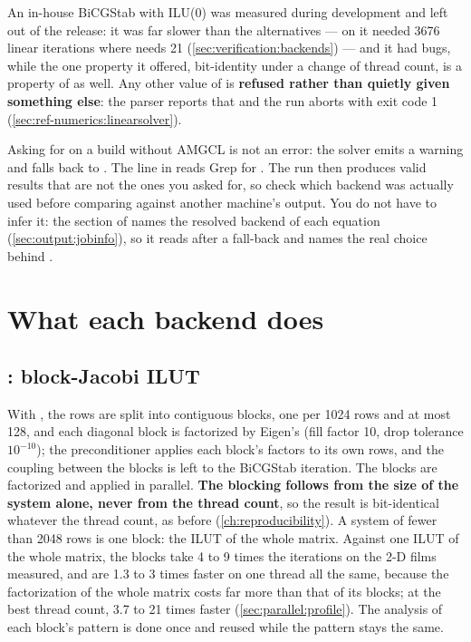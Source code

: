 \begin{note}
  An in-house BiCGStab with ILU(0) was measured during development and left
  out of the release: it was far slower than the alternatives --- on
   it needed 3676 linear iterations where
   needs 21 (\cref{sec:verification:backends}) --- and it had
  bugs, while the one property it offered, bit-identity under a change of
  thread count, is a property of  as well. Any other value of
   is \textbf{refused rather than quietly given something
  else}: the parser reports that   and the run aborts with exit code 1
  (\cref{sec:ref-numerics:linearsolver}).
\end{note}

Asking for  on a build without AMGCL is not an error: the solver
emits a warning and falls back to . The line in
 reads  Grep for
. The run then produces valid
results that are not the ones you asked for, so check which backend was
actually used before comparing against another machine's output. You do not
have to infer it: the  section of
 names the resolved backend of each equation
(\cref{sec:output:jobinfo}), so it reads  after a fall-back and
names the real choice behind .

\section{What each backend does}
\label{sec:linsolve:what}

\subsection{: block-Jacobi ILUT}
\label{sec:linsolve:eigen}

With  , the rows are split into contiguous
blocks, one per 1024 rows and at most 128, and each diagonal block is
factorized by Eigen's  (fill factor 10, drop tolerance
$10^{-10}$); the preconditioner applies each block's factors to its own rows,
and the coupling between the blocks is left to the BiCGStab iteration. The
blocks are factorized and applied in parallel. \textbf{The blocking follows
from the size of the system alone, never from the thread count}, so the
result is bit-identical whatever the thread count, as before
(\cref{ch:reproducibility}). A system of fewer than 2048 rows is one block:
the ILUT of the whole matrix. Against one ILUT of the whole matrix, the blocks
take 4 to 9 times the iterations on the 2-D films measured, and are 1.3 to 3
times faster on one thread all the same, because the factorization of the
whole matrix costs far more than that of its blocks; at the best thread
count, 3.7 to 21 times faster (\cref{sec:parallel:profile}). The analysis of each block's
pattern is done once and reused while the pattern stays the same.

